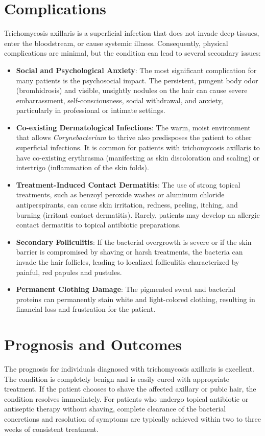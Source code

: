 \section*{Complications}
Trichomycosis axillaris is a superficial infection that does not invade deep tissues, enter the bloodstream, or cause systemic illness. Consequently, physical complications are minimal, but the condition can lead to several secondary issues:
\begin{itemize}
    \item \textbf{Social and Psychological Anxiety}: The most significant complication for many patients is the psychosocial impact. The persistent, pungent body odor (bromhidrosis) and visible, unsightly nodules on the hair can cause severe embarrassment, self-consciousness, social withdrawal, and anxiety, particularly in professional or intimate settings.
    \item \textbf{Co-existing Dermatological Infections}: The warm, moist environment that allows \textit{Corynebacterium} to thrive also predisposes the patient to other superficial infections. It is common for patients with trichomycosis axillaris to have co-existing erythrasma (manifesting as skin discoloration and scaling) or intertrigo (inflammation of the skin folds).
    \item \textbf{Treatment-Induced Contact Dermatitis}: The use of strong topical treatments, such as benzoyl peroxide washes or aluminum chloride antiperspirants, can cause skin irritation, redness, peeling, itching, and burning (irritant contact dermatitis). Rarely, patients may develop an allergic contact dermatitis to topical antibiotic preparations.
    \item \textbf{Secondary Folliculitis}: If the bacterial overgrowth is severe or if the skin barrier is compromised by shaving or harsh treatments, the bacteria can invade the hair follicles, leading to localized folliculitis characterized by painful, red papules and pustules.
    \item \textbf{Permanent Clothing Damage}: The pigmented sweat and bacterial proteins can permanently stain white and light-colored clothing, resulting in financial loss and frustration for the patient.
\end{itemize}

\section*{Prognosis and Outcomes}
The prognosis for individuals diagnosed with trichomycosis axillaris is excellent. The condition is completely benign and is easily cured with appropriate treatment.
If the patient chooses to shave the affected axillary or pubic hair, the condition resolves immediately. For patients who undergo topical antibiotic or antiseptic therapy without shaving, complete clearance of the bacterial concretions and resolution of symptoms are typically achieved within two to three weeks of consistent treatment.

